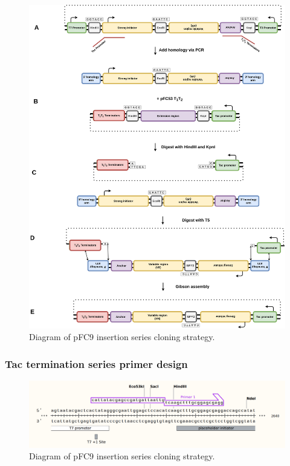 \documentclass[11pt]{article}
\begin{document}
\begin{figure}[H]
	\includegraphics[width=15cm]{images/cloning_diagrams/construct_diagrams-Tac-termination-series.png}
	\centering
	\caption{Diagram of pFC9 insertion series cloning strategy.}
\end{figure}

\subsubsection{Tac termination series primer design}

\begin{figure}[H]
	\includegraphics[width=15cm]{images/primers/tac_term_primers/placeholder-init-tac-promoter.png}
	\centering
	\caption{Diagram of pFC9 insertion series cloning strategy.}
\end{figure}
\end{document}

